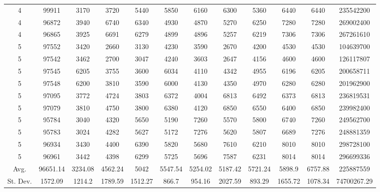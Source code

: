 \documentclass[journal]{IEEEtran}
\begin{document}
\begin{table}
\begin{tabular}{|cc|cccccccc|cc|}
4	&	99911	&	3170	&	3720	&	5440	&	5850	&	6160	&	6300	&	5360	&	6440	&	6440	&	235542200	\\
4	&	96872	&	3940	&	6740	&	6340	&	4930	&	4870	&	5270	&	6250	&	7280	&	7280	&	269002400	\\
4	&	96865	&	3925	&	6691	&	6279	&	4899	&	4896	&	5257	&	6219	&	7306	&	7306	&	267261610	\\
\hline																							
5	&	97552	&	3420	&	2660	&	3130	&	4230	&	3590	&	2670	&	4200	&	4530	&	4530	&	104639700	\\
5	&	97542	&	3462	&	2700	&	3047	&	4240	&	3603	&	2647	&	4156	&	4600	&	4600	&	126117807	\\
5	&	97545	&	6205	&	3755	&	3600	&	6034	&	4110	&	4342	&	4955	&	6196	&	6205	&	200658711	\\
5	&	97548	&	6200	&	3810	&	3590	&	6000	&	4130	&	4350	&	4970	&	6280	&	6280	&	201962900	\\
5	&	97095	&	3772	&	4724	&	3803	&	6372	&	4004	&	6813	&	6492	&	6373	&	6813	&	236819531	\\
5	&	97079	&	3810	&	4750	&	3800	&	6380	&	4120	&	6850	&	6550	&	6400	&	6850	&	239982400	\\
5	&	95784	&	3040	&	4320	&	5650	&	5190	&	7260	&	5570	&	5800	&	6740	&	7260	&	249562700	\\
5	&	95783	&	3024	&	4282	&	5627	&	5172	&	7276	&	5620	&	5807	&	6689	&	7276	&	248881359	\\
5	&	96934	&	3430	&	4400	&	6390	&	5820	&	5680	&	7610	&	6210	&	8010	&	8010	&	298728100	\\
5	&	96961	&	3442	&	4398	&	6299	&	5725	&	5696	&	7587	&	6231	&	8014	&	8014	&	296699336	\\
\hline																							
Avg.	&	96651.14	&	3234.08	&	4562.24	&	5042	&	5547.54	&	5254.02	&	5187.42	&	5721.24	&	5898.9	&	6757.88	&	225887559	\\
St. Dev.	&	1572.09	&	1214.2	&	1789.59	&	1512.27	&	866.7	&	954.16	&	2027.59	&	893.29	&	1655.72	&	1078.34	&	74700267.29	\\
\hline																							

\end{tabular}
\end{table}
\end{document}
